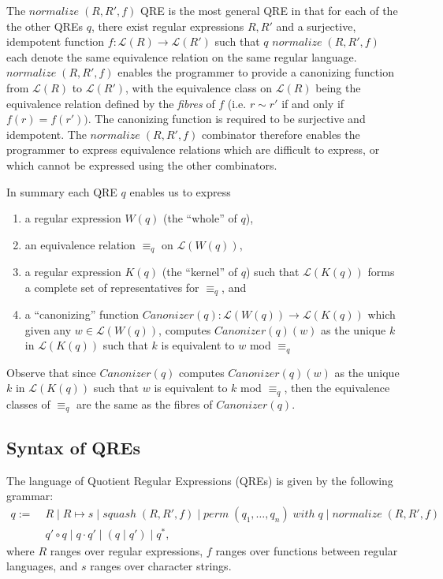 \documentclass{svproc}
\newcommand{\squash}[3]{\ensuremath{\mathit{squash} \; (#1, #2, #3)}}
\newcommand{\perm}[2]{\ensuremath{\mathit{perm}\; (#1)\; \mathit{with}\; #2}}
\newcommand{\normalize}[3]{\ensuremath{\mathit{normalize} \; (#1, #2, #3)}}
\newcommand{\sep}{\ensuremath{\; | \;}}
\newcommand{\canonizer}{\ensuremath{\mathit{Canonizer}}}
\newcommand{\eqrel}[1]{\ensuremath{\equiv_{#1}}}
\begin{document}
The $\normalize{R}{R'}{f}$ QRE is the most general QRE in that for each of the
the other QREs $q$, there exist regular expressions $R, R'$ and a surjective,
idempotent function $f:\mathcal{L}(R) \longrightarrow \mathcal{L}(R')$ such that
$q$ $\normalize{R}{R'}{f}$ each denote the same equivalence relation on the
same regular language. $\normalize{R}{R'}{f}$ enables the programmer to
provide a canonizing function from $\mathcal{L}(R)$ to $\mathcal{L}(R')$,
with the equivalence class on $\mathcal{L}(R)$ being the equivalence relation
defined by the {\em fibres} of $f$ (i.e. $r \sim r'$ if and only if $f(r) =
f(r'))$. The canonizing function is required to be surjective and idempotent.
The $\normalize{R}{R'}{f}$ combinator therefore enables the programmer to express
equivalence relations which are difficult to express, or which cannot be
expressed using the other combinators.

In summary each QRE $q$ enables us to express
\begin{enumerate}
\item a regular expression $W(q)$ (the ``whole'' of $q$),
\item an equivalence relation $\eqrel{q}$ on $\mathcal{L}(W(q))$,
\item a regular expression $K(q)$ (the ``kernel'' of $q$)
  such that $\mathcal{L}(K(q))$ forms a complete set of representatives for
  $\eqrel{q}$, and
\item a ``canonizing'' function $\canonizer(q):\mathcal{L}(W(q))
  \longrightarrow \mathcal{L}(K(q))$ which given any $w \in \mathcal{L}(W(q))$,
  computes $\canonizer(q)(w)$ as the unique $k$ in $\mathcal{L}(K(q))$ such that
  $k$ is equivalent to $w$ mod $\eqrel{q}$
\end{enumerate}
Observe that since $\canonizer(q)$ computes $\canonizer(q)(w)$ as the unique
$k$ in $\mathcal{L}(K(q))$ such that $w$ is equivalent to $k$ mod $\eqrel{q}$,
then the equivalence classes of $\eqrel{q}$ are the same as the fibres of
$\canonizer(q)$.
\subsection{Syntax of QREs}
The language of Quotient Regular Expressions (QREs) is given by the following
grammar:
\begin{align*}
  q := \; &R \sep R \mapsto s \sep \squash{R}{R'}{f} \sep
            \perm{q_1, \ldots, q_n}{q} \;  | \; \normalize{R}{R'}{f}\\
          &q' \circ q \sep q \cdot q' \sep (q \sep q') \sep q^*,
\end{align*}
where $R$ ranges over regular expressions, $f$ ranges over functions between
regular languages, and $s$ ranges over character strings.
\end{document}
